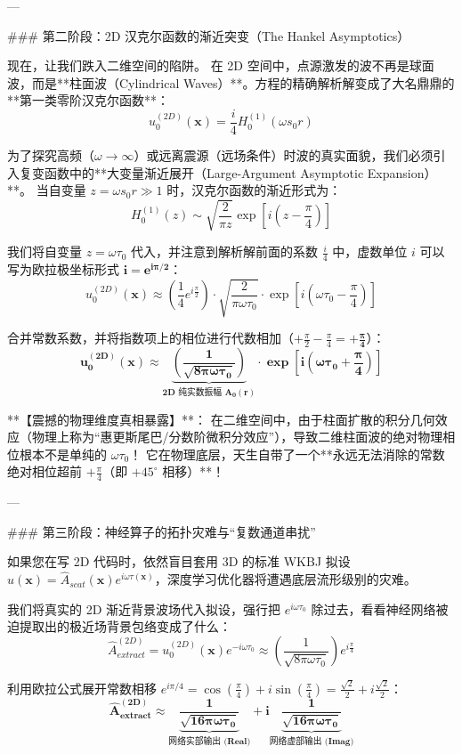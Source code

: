 \documentclass[12pt]{article}
\begin{document}
{---

### 第二阶段：2D 汉克尔函数的渐近突变（The Hankel Asymptotics）

现在，让我们跌入二维空间的陷阱。
在 2D 空间中，点源激发的波不再是球面波，而是**柱面波（Cylindrical Waves）**。方程的精确解析解变成了大名鼎鼎的**第一类零阶汉克尔函数**：
$$ u_0^{(2D)}(\mathbf{x}) = \frac{i}{4} H_0^{(1)}(\omega s_0 r) $$

为了探究高频（$\omega \to \infty$）或远离震源（远场条件）时波的真实面貌，我们必须引入复变函数中的**大变量渐近展开（Large-Argument Asymptotic Expansion）**。
当自变量 $z = \omega s_0 r \gg 1$ 时，汉克尔函数的渐近形式为：
$$ H_0^{(1)}(z) \sim \sqrt{\frac{2}{\pi z}} \exp\left[ i \left( z - \frac{\pi}{4} \right) \right] $$

我们将自变量 $z = \omega \tau_0$ 代入，并注意到解析解前面的系数 $\frac{i}{4}$ 中，虚数单位 $i$ 可以写为欧拉极坐标形式 $\mathbf{i = e^{i \pi/2}}$：
$$ u_0^{(2D)}(\mathbf{x}) \approx \left( \frac{1}{4} e^{i \frac{\pi}{2}} \right) \cdot \sqrt{\frac{2}{\pi \omega \tau_0}} \cdot \exp\left[ i \left( \omega \tau_0 - \frac{\pi}{4} \right) \right] $$

合并常数系数，并将指数项上的相位进行代数相加（$+\frac{\pi}{2} - \frac{\pi}{4} = \mathbf{+\frac{\pi}{4}}$）：
$$ \mathbf{u_0^{(2D)}(\mathbf{x}) \approx \underbrace{\left( \frac{1}{\sqrt{8\pi \omega \tau_0}} \right)}_{\text{2D 纯实数振幅 } A_0(r)} \cdot \exp\left[ i \left( \omega \tau_0 + \frac{\pi}{4} \right) \right]} $$

**【震撼的物理维度真相暴露】**：
在二维空间中，由于柱面扩散的积分几何效应（物理上称为“惠更斯尾巴/分数阶微积分效应”），导致二维柱面波的绝对物理相位根本不是单纯的 $\omega \tau_0$！
它在物理底层，天生自带了一个**永远无法消除的常数绝对相位超前 $+\frac{\pi}{4}$（即 $+45^\circ$ 相移）**！

---

### 第三阶段：神经算子的拓扑灾难与“复数通道串扰”

如果您在写 2D 代码时，依然盲目套用 3D 的标准 WKBJ 拟设 $u(\mathbf{x}) = \hat{A}_{scat}(\mathbf{x}) e^{i \omega \tau(\mathbf{x})}$，深度学习优化器将遭遇底层流形级别的灾难。

我们将真实的 2D 渐近背景波场代入拟设，强行把 $e^{i\omega\tau_0}$ 除过去，看看神经网络被迫提取出的极近场背景包络变成了什么：
$$ \hat{A}_{extract}^{(2D)} = u_0^{(2D)}(\mathbf{x}) e^{-i \omega \tau_0} \approx \left( \frac{1}{\sqrt{8\pi \omega \tau_0}} \right) e^{i \frac{\pi}{4}} $$

利用欧拉公式展开常数相移 $e^{i \pi/4} = \cos(\frac{\pi}{4}) + i \sin(\frac{\pi}{4}) = \frac{\sqrt{2}}{2} + i \frac{\sqrt{2}}{2}$：
$$ \mathbf{\hat{A}_{extract}^{(2D)} \approx \underbrace{\frac{1}{\sqrt{16\pi \omega \tau_0}}}_{\text{网络实部输出 (Real)}} + i \underbrace{\frac{1}{\sqrt{16\pi \omega \tau_0}}}_{\text{网络虚部输出 (Imag)}}} $$

}
\end{document}
